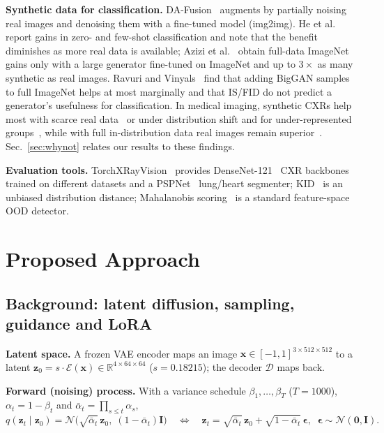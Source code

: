 \documentclass[twoside,english]{article}
\newcommand{\R}{\mathbb{R}}
\newcommand{\x}{\mathbf{x}}
\newcommand{\z}{\mathbf{z}}
\newcommand{\eps}{\boldsymbol{\epsilon}}
\newcommand{\abar}{\bar\alpha}
\begin{document}
\textbf{Synthetic data for classification.} DA-Fusion~\citep{trabucco2024dafusion} augments by partially noising real images and denoising them with a fine-tuned model (img2img). He et al.~\citep{he2023synthetic} report gains in zero- and few-shot classification and note that the benefit diminishes as more real data is available; Azizi et al.~\citep{azizi2023synthetic} obtain full-data ImageNet gains only with a large generator fine-tuned on ImageNet and up to $3\times$ as many synthetic as real images. Ravuri and Vinyals~\citep{ravuri2019cas} find that adding BigGAN samples to full ImageNet helps at most marginally and that IS/FID do not predict a generator's usefulness for classification. In medical imaging, synthetic CXRs help most with scarce real data~\citep{chambon2022roentgen,prakash2025synthetic} or under distribution shift and for under-represented groups~\citep{ktena2024fairness}, while with full in-distribution data real images remain superior~\citep{khosravi2024synthetically}. Sec.~\ref{sec:whynot} relates our results to these findings.

\textbf{Evaluation tools.} TorchXRayVision~\citep{cohen2022xrv} provides DenseNet-121~\citep{huang2017densenet} CXR backbones trained on different datasets and a PSPNet~\citep{zhao2017pspnet} lung/heart segmenter; KID~\citep{binkowski2018kid} is an unbiased distribution distance; Mahalanobis scoring~\citep{lee2018mahalanobis} is a standard feature-space OOD detector.

\section{Proposed Approach}\label{sec:our_proj}

\subsection{Background: latent diffusion, sampling, guidance and LoRA}\label{sec:background}
\textbf{Latent space.} A frozen VAE encoder maps an image $\x\in[-1,1]^{3\times512\times512}$ to a latent $\z_0 = s\cdot\mathcal{E}(\x)\in\R^{4\times64\times64}$ ($s=0.18215$); the decoder $\mathcal{D}$ maps back.

\textbf{Forward (noising) process.} With a variance schedule $\beta_1,\dots,\beta_T$ ($T=1000$), $\alpha_t=1-\beta_t$ and $\abar_t=\prod_{s\le t}\alpha_s$,
\begin{equation}
q(\z_t\mid\z_0)=\mathcal{N}\!\big(\sqrt{\abar_t}\,\z_0,\;(1-\abar_t)\mathbf{I}\big)
\quad\Longleftrightarrow\quad
\z_t=\sqrt{\abar_t}\,\z_0+\sqrt{1-\abar_t}\,\eps,\;\;\eps\sim\mathcal{N}(\mathbf{0},\mathbf{I}).\label{eq:forward}
\end{equation}
\end{document}
